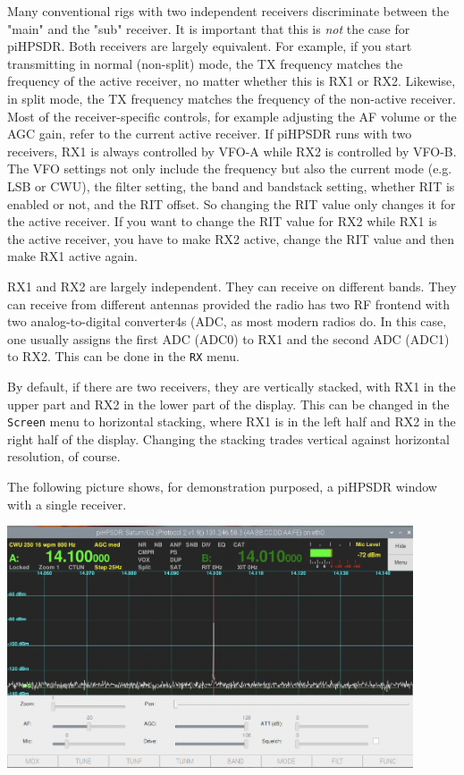 \documentclass[12pt]{book}
\begin{document}
 Many conventional rigs with two independent receivers discriminate
 between the "main" and the "sub" receiver. It is important that
 this is \textit{not} the case for piHPSDR. Both  receivers are
 largely equivalent. For example, if you start transmitting in
 normal (non-split) mode, the TX frequency matches the frequency
 of the active receiver, no matter whether this is RX1 or RX2.
 Likewise, in split mode, the TX frequency matches the frequency
 of the non-active receiver. Most of the receiver-specific controls,
 for example adjusting the AF volume or the AGC gain, refer to the
 current active receiver. If piHPSDR runs with two receivers,
 RX1 is always controlled by VFO-A while RX2 is controlled by VFO-B.
 The VFO settings not only include the frequency but also the
 current mode (e.g. LSB or CWU), the filter setting, the band and
 bandstack setting, whether RIT is enabled or not, and the RIT
 offset. So changing the RIT value only changes it for the active
 receiver. If you want  to change the RIT value for RX2 while RX1 is
 the active receiver, you have to make RX2 active, change the RIT
 value and then make RX1 active again.
 
 RX1 and RX2 are largely independent. They can receive on different
 bands. They can receive from different antennas provided the radio
 has two RF frontend with two analog-to-digital converter4s (ADC,
 as most modern radios do. In this case, one usually
 assigns the first ADC (ADC0) to RX1 and the second ADC (ADC1) to
 RX2. This can be done in the \texttt{RX} menu.
 
 By default, if there are two receivers, they are vertically stacked,
 with RX1 in the upper part and RX2 in the lower part of the display.
 This can be changed in the \texttt{Screen} menu to horizontal stacking,
 where RX1 is  in the left half and RX2 in the right half of  the 
 display. Changing the stacking trades vertical against horizontal
 resolution, of course.
 
 The following picture shows, for demonstration purposed, a piHPSDR
 window with a single receiver. 
 
\begin{center}
\includegraphics[width=12cm]{SingleReceiver.png}
\end{center}
 
\end{document}
